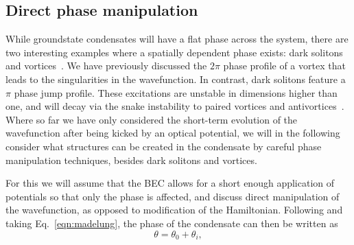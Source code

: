 \subsection{Direct phase manipulation}\label{sec:phase}

While groundstate condensates will have a flat phase across the system, there are two interesting examples where a spatially dependent phase exists: dark solitons~\cite{BEC:Denschlag_science_2000} and vortices~\cite{Vtx:Dobrek_pra_1999}. We have previously discussed the $2\pi$ phase profile of a vortex that leads to the singularities in the wavefunction. In contrast, dark solitons feature a $\pi$ phase jump profile. These excitations are unstable in dimensions higher than one, and will decay via the snake instability to paired vortices and antivortices~\cite{BEC:Brand_pra_2002}. Where so far we have only considered the short-term evolution of the wavefunction after being kicked by an optical potential, we will in the following consider what structures can be created in the condensate by careful phase manipulation techniques, besides dark solitons and vortices.

For this we will assume that the BEC allows for a short enough application of potentials so that only the phase is affected, and discuss direct manipulation of the wavefunction, as opposed to modification of the Hamiltonian. Following \cite{BK:Pitaevskii_Stringari_2003} and taking Eq.~\eqref{eqn:madelung}, the phase of the condensate can then be written as
\begin{equation}
\theta = \theta_0 + \theta_i,
\end{equation}


